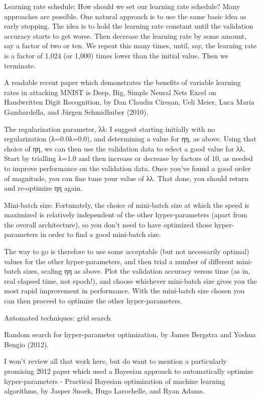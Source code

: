 \documentclass[]{book}
\begin{document}
Learning rate schedule: How should we set our learning rate schedule?
Many approaches are possible. One natural approach is to use the same
basic idea as early stopping. The idea is to hold the learning rate
constant until the validation accuracy starts to get worse. Then
decrease the learning rate by some amount, say a factor of two or ten.
We repeat this many times, until, say, the learning rate is a factor of
1,024 (or 1,000) times lower than the initial value. Then we terminate.

A readable recent paper which demonstrates the benefits of variable
learning rates in attacking MNIST is Deep, Big, Simple Neural Nets Excel
on Handwritten Digit Recognition, by Dan Claudiu Cireșan, Ueli Meier,
Luca Maria Gambardella, and Jürgen Schmidhuber (2010).

The regularization parameter, λλ: I suggest starting initially with no
regularization (λ=0.0λ=0.0), and determining a value for ηη, as above.
Using that choice of ηη, we can then use the validation data to select a
good value for λλ. Start by trialling λ=1.0 and then increase or
decrease by factors of 10, as needed to improve performance on the
validation data. Once you've found a good order of magnitude, you can
fine tune your value of λλ. That done, you should return and re-optimize
ηη again.

Mini-batch size: Fortunately, the choice of mini-batch size at which the
speed is maximized is relatively independent of the other
hyper-parameters (apart from the overall architecture), so you don't
need to have optimized those hyper-parameters in order to find a good
mini-batch size.

The way to go is therefore to use some acceptable (but not necessarily
optimal) values for the other hyper-parameters, and then trial a number
of different mini-batch sizes, scaling ηη as above. Plot the validation
accuracy versus time (as in, real elapsed time, not epoch!), and choose
whichever mini-batch size gives you the most rapid improvement in
performance. With the mini-batch size chosen you can then proceed to
optimize the other hyper-parameters.

Automated techniques: grid search

Random search for hyper-parameter optimization, by James Bergstra and
Yoshua Bengio (2012).

I won't review all that work here, but do want to mention a particularly
promising 2012 paper which used a Bayesian approach to automatically
optimize hyper-parameters - Practical Bayesian optimization of machine
learning algorithms, by Jasper Snoek, Hugo Larochelle, and Ryan Adams.
\end{document}
